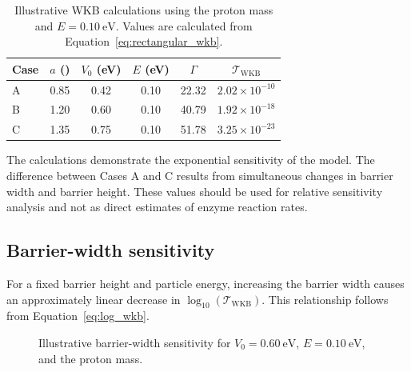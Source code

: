 \documentclass[11pt,a4paper]{article}
\newcommand{\WKB}{\mathrm{WKB}}
\newcommand{\trans}{\mathcal{T}}
\newcommand{\angstromunit}{\text{\AA}}
\begin{document}
\begin{table}[htbp]
\centering
\caption{
Illustrative WKB calculations using the proton mass and
$E=\SI{0.10}{\electronvolt}$. Values are calculated from
Equation~\eqref{eq:rectangular_wkb}.
}
\label{tab:reference}
\begin{tabular}{@{}lccccc@{}}
\toprule
Case & $a$ (\angstromunit) & $V_0$ (eV) & $E$ (eV)
& $\Gamma$ & $\trans_{\WKB}$ \\
\midrule
A & 0.85 & 0.42 & 0.10 & 22.32 & $2.02\times10^{-10}$ \\
B & 1.20 & 0.60 & 0.10 & 40.79 & $1.92\times10^{-18}$ \\
C & 1.35 & 0.75 & 0.10 & 51.78 & $3.25\times10^{-23}$ \\
\bottomrule
\end{tabular}
\end{table}

The calculations demonstrate the exponential sensitivity of the model. The
difference between Cases A and C results from simultaneous changes in barrier
width and barrier height. These values should be used for relative sensitivity
analysis and not as direct estimates of enzyme reaction rates.

\subsection{Barrier-width sensitivity}

For a fixed barrier height and particle energy, increasing the barrier width
causes an approximately linear decrease in $\log_{10}(\trans_{\WKB})$. This
relationship follows from Equation~\eqref{eq:log_wkb}.

\begin{figure}[htbp]
\centering
{}
\caption{
Illustrative barrier-width sensitivity for
$V_0=\SI{0.60}{\electronvolt}$,
$E=\SI{0.10}{\electronvolt}$, and the proton mass.
}
\label{fig:width}
\end{figure}
\end{document}
